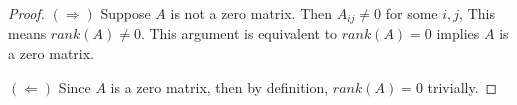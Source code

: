 \begin{Exercise}
\begin{proof}
$(\Longrightarrow)$
Suppose $A$ is not a zero matrix. Then $A_{i j}\neq 0$ for some $i,j$, This means $rank(A)\neq 0$. This argument is equivalent to $rank(A) = 0$ implies $A$ is a zero matrix.

\vspace{2ex}

$(\Longleftarrow)$
Since $A$ is a zero matrix, then by definition, $rank(A) = 0$ trivially.
\end{proof}
\end{Exercise}